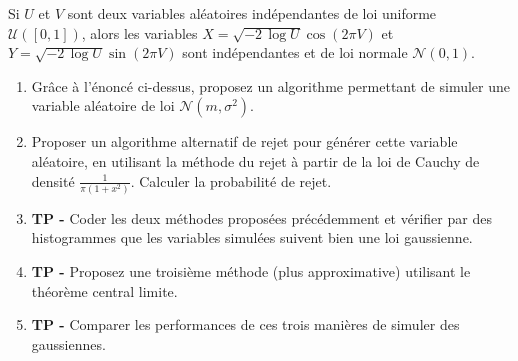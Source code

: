 \documentclass[solutions]{exercices}
\begin{document}
\begin{exercice}
Si $U$ et $V$ sont deux variables
al\'eatoires ind\'ependantes de loi uniforme ${\mathcal U}([0,1])$,
alors les variables $X=\sqrt{-2\,\log U}\cos(2\pi V)$ et
$Y=\sqrt{-2\,\log U}\sin(2\pi V)$
sont ind\'ependantes et de loi normale ${\mathcal N}(0,1)$.
\begin{enumerate}
\item Grâce à l'énoncé ci-dessus, proposez un algorithme permettant de simuler une variable aléatoire de loi $\mathcal{N}(m,\sigma^2)$.
\item Proposer un algorithme alternatif de rejet pour générer cette variable aléatoire, en utilisant la méthode du rejet à partir de la loi de Cauchy de densité $\frac{1}{\pi(1+x^2)}.$ Calculer la probabilité de rejet.
\item \textbf{TP -}  Coder les deux méthodes proposées précédemment et vérifier par des histogrammes que les variables simulées suivent bien une loi gaussienne.
\item \textbf{TP -} Proposez une troisième méthode (plus approximative) utilisant le théorème central limite.
\item \textbf{TP -} Comparer les performances de ces trois manières de simuler des gaussiennes.
\end{enumerate}
\end{exercice}
\end{document}

